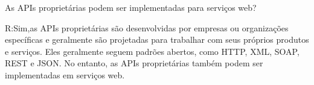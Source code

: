 As APIs proprietárias podem ser implementadas para
serviços web?

R:Sim,as APIs proprietárias são desenvolvidas por empresas ou organizações específicas
e geralmente são projetadas para trabalhar com seus próprios produtos e serviços.
Eles geralmente seguem padrões abertos, como HTTP, XML, SOAP, REST e JSON. 
No entanto, as APIs proprietárias também podem ser implementadas em serviços web.